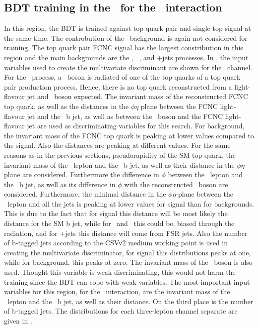 \clearpage
\subsection{BDT training in the \TTSR\ for the \Zut\ interaction}
\label{sec:BDTTTSRZUT}
In this region, the BDT is trained against top quark pair and single top signal at the same time. The controbution of the \NPL\ background is again not considered for training. The top quark pair FCNC signal has the largest constribution in this region and the main backgrounds are the \ttZ, \SM\ \tZq, and \WZ+jets processes. In , the input variables used to create the multivariate discriminant are shown for the \mumumu\ channel. For the \ttZ\ process, a \PZ\ boson is radiated of one of the top quarks of a top quark pair production process. Hence, there is no top quark reconstructed from a light-flavour jet and \PZ\ boson expected. The invariant mass of the reconstructed FCNC top quark, as well as the distances in the $\phi\eta$ plane between the FCNC light-flavour jet and the \SM\ b jet, as well as between the \PZ\ boson and the FCNC light-flavour jet are used as discriminating variables for this search. For background, the invariant mass of the FCNC top quark is peaking at lower values compared to the signal. Also the distances are peaking at different values. For the same reasons as in the previous sections, pseudorapidity of the SM top quark,  the invariant mass of the \PW\ lepton and the \SM\ b jet, as well as their distance in the $\phi\eta$-plane are considered. Furthermore the difference in $\phi$ between the \PW\ lepton and the \SM\ b jet, as well as its difference in $\phi$ with the reconstructed \PZ\ boson are considered. Furthermore, the minimal distance in the $\phi\eta$-plane between the \PW\ lepton and all the jets is peaking at lower values for signal than for backgrounds. This is due to the fact that for signal this distance will be most likely the distance for the SM b  jet, while for \ttZ\ and \tZq\ this could be, biased through the radiation, and for \WZ+jets this distance will come from FSR jets. Also the number of b-tagged jets according to the CSVv2 medium working point is used in creating the multivariate discriminator, for signal this distributions peaks at one, while for background, this peaks at zero. The invariant mass of the \PZ\ boson is also used. Thought this variable is weak discriminating, this would not harm the training since the BDT can cope with weak variables.  The most important input variables for this region, for the \Zut\ interaction, are the invariant mass of the \PW\ lepton and the \SM\ b jet, as well as their distance. On the third place is the number of b-tagged jets. The distributions for each three-lepton channel separate are given in .

